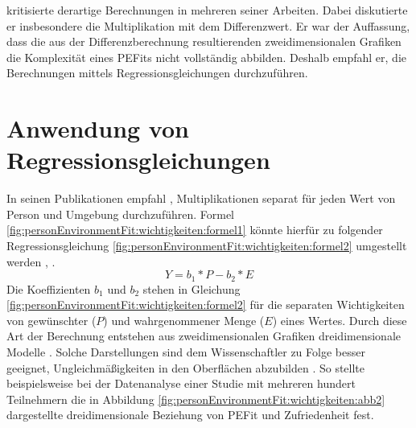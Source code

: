 \textcite[S. 51ff.]{edwards:1991}\cite[S. 9ff.]{edwards:1990}\cite[S. 2ff.]{edwards:1993}\cite[S. 2ff.]{edwards:1993b} kritisierte derartige Berechnungen in mehreren seiner Arbeiten. Dabei diskutierte er insbesondere die Multiplikation mit dem Differenzwert. Er war der Auffassung, dass die aus der Differenzberechnung resultierenden zweidimensionalen Grafiken die Komplexität eines \acp{PEFit} nicht vollständig abbilden. Deshalb empfahl er, die Berechnungen mittels Regressionsgleichungen durchzuführen.

\section{Anwendung von Regressionsgleichungen}
\label{ch:personEnvironmentFit:regressionsgleichungen}
In seinen Publikationen empfahl \textcite[S. 51ff.]{edwards:1991}\cite[S. 9ff.]{edwards:1990}\cite[S. 2ff.]{edwards:1993}\cite[S. 2ff.]{edwards:1993b}, Multiplikationen separat für jeden Wert von Person und Umgebung durchzuführen. Formel \ref{fig:personEnvironmentFit:wichtigkeiten:formel1} könnte hierfür zu folgender Regressionsgleichung \ref{fig:personEnvironmentFit:wichtigkeiten:formel2} umgestellt werden \cite[S. 9f.]{edwards:1990}, \cite[S. 2f.]{edwards:1993b}.
\begin{equation}
	Y = b_1 * P - b_2 * E
	\label{fig:personEnvironmentFit:wichtigkeiten:formel2}
\end{equation}
Die Koeffizienten $b_1$ und $b_2$ stehen in Gleichung \ref{fig:personEnvironmentFit:wichtigkeiten:formel2} für die separaten Wichtigkeiten von gewünschter ($P$) und wahrgenommener Menge ($E$) eines Wertes. Durch diese Art der Berechnung entstehen aus zweidimensionalen Grafiken dreidimensionale Modelle \cite[S. 2]{edwards:1993}. Solche Darstellungen sind dem Wissenschaftler zu Folge besser geeignet, Ungleichmäßigkeiten in den Oberflächen abzubilden \cite[S. 51ff.]{edwards:1991}. So stellte \textcite[S. 53ff.]{edwards:1991} beispielsweise bei der Datenanalyse einer Studie mit mehreren hundert Teilnehmern die in Abbildung \ref{fig:personEnvironmentFit:wichtigkeiten:abb2} dargestellte dreidimensionale Beziehung von \ac{PEFit} und Zufriedenheit fest.

